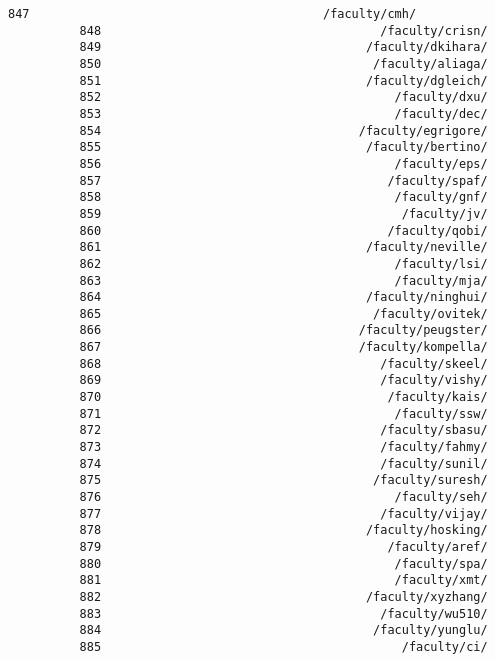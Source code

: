 \documentclass[11pt]{article}
\begin{document}
\begin{Verbatim}[commandchars=\\\{\}]
          847                                         /faculty/cmh/
          848                                       /faculty/crisn/
          849                                     /faculty/dkihara/
          850                                      /faculty/aliaga/
          851                                     /faculty/dgleich/
          852                                         /faculty/dxu/
          853                                         /faculty/dec/
          854                                    /faculty/egrigore/
          855                                     /faculty/bertino/
          856                                         /faculty/eps/
          857                                        /faculty/spaf/
          858                                         /faculty/gnf/
          859                                          /faculty/jv/
          860                                        /faculty/qobi/
          861                                     /faculty/neville/
          862                                         /faculty/lsi/
          863                                         /faculty/mja/
          864                                     /faculty/ninghui/
          865                                      /faculty/ovitek/
          866                                    /faculty/peugster/
          867                                    /faculty/kompella/
          868                                       /faculty/skeel/
          869                                       /faculty/vishy/
          870                                        /faculty/kais/
          871                                         /faculty/ssw/
          872                                       /faculty/sbasu/
          873                                       /faculty/fahmy/
          874                                       /faculty/sunil/
          875                                      /faculty/suresh/
          876                                         /faculty/seh/
          877                                       /faculty/vijay/
          878                                     /faculty/hosking/
          879                                        /faculty/aref/
          880                                         /faculty/spa/
          881                                         /faculty/xmt/
          882                                     /faculty/xyzhang/
          883                                       /faculty/wu510/
          884                                      /faculty/yunglu/
          885                                          /faculty/ci/

\end{Verbatim}
\end{document}
